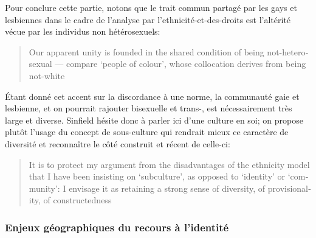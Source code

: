 Pour conclure cette partie, notons que le trait commun partagé par les gays et lesbiennes dans le cadre de l'analyse par l'ethnicité-et-des-droits est l'altérité vécue par les individus non hétérosexuels: \foreignblockquote{english}[{\cite[289]{Sinfield1996}}][.]{Our apparent unity is founded in the shared condition of being not-heterosexual --- compare `people of colour', whose collocation derives from being not-white}. 
Étant donné cet accent sur la discordance à une norme, la communauté gaie et lesbienne, et on pourrait rajouter bisexuelle et trans-, est nécessairement très large et diverse. 
Sinfield hésite donc à parler ici d'une culture en soi; on propose plutôt l'usage du concept de sous-culture qui rendrait mieux ce caractère de diversité et reconnaître le côté construit et récent de celle-ci:
\foreignblockquote{english}[{\cite[289]{Sinfield1996}}][.]{It is to protect my argument from the disadvantages of the ethnicity model that I have been insisting on `subculture', as opposed to `identity' or `community': I envisage it as retaining a strong sense of diversity, of provisionality, of constructedness}.



\subsubsection{Enjeux géographiques du recours à l'identité}
\label{sec:enjeux_g_ographiques_du_recours_l_identit_} 

